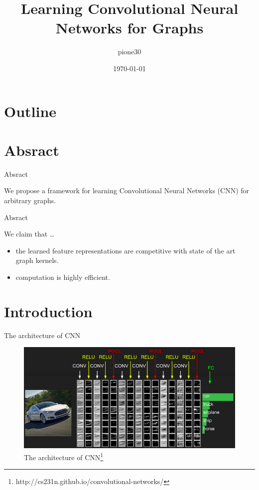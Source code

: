 \documentclass[dvipdfmx]{beamer}
\title{Learning Convolutional Neural Networks for Graphs}
\author{pione30}
\date{\today}
\begin{document}
  \frame[plain]{\titlepage}


\section*{Outline}

  \begin{frame}
    \tableofcontents
  \end{frame}

\section{Absract}

  \begin{frame}{Absract}

    \alert{We propose a framework for learning Convolutional Neural Networks (CNN) for arbitrary graphs.}
  \end{frame}

  \begin{frame}{Absract}

    \begin{block}{We claim that \dots }
      \begin{itemize}
        \item{the learned feature representations are competitive with state of the art graph kernels.} 
        \item{computation is highly efficient.}
      \end{itemize}
    \end{block}
  \end{frame}

\section{Introduction}

  \begin{frame}{The architecture of CNN}
    \begin{figure}[h]
      \centering
      \includegraphics[width=0.8\paperwidth]{img/CS231n-CNN-architecture.png}
      \caption{The architecture of CNN\footnote{http://cs231n.github.io/convolutional-networks/}}
    \end{figure}
  \end{frame}
\end{document}
